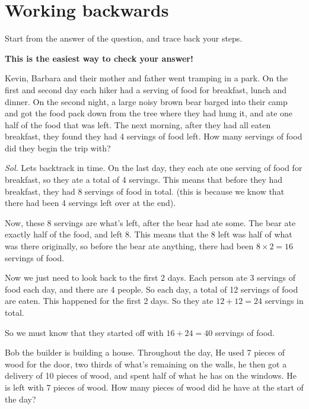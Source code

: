 \documentclass{article}
\theoremstyle{mytheoremstyle}
\theoremstyle{mytheoremstyle}
\theoremstyle{myproblemstyle}
\theoremstyle{myproblemstyle}
\begin{document}
    \section{Working backwards}
    Start from the answer of the question, and trace back your steps.

    \textbf{This is the easiest way to check your answer!}

    \begin{example}
        Kevin, Barbara and their mother and father went tramping in a park. On the first and second day each hiker had a serving of food for breakfast, lunch and dinner. On the second night, a large noisy brown bear barged into their camp and got the food pack down from the tree where they had hung it, and ate one half of the food that was left. The next morning, after they had all eaten breakfast, they found they had 4 servings of food left. How many servings of food did they begin the trip with?
    \end{example}

    \textit{ Sol. } Lets backtrack in time. On the last day, they each ate one serving of food for breakfast, so they ate a total of 4 servings. This means that before they had breakfast, they had 8 servings of food in total. (this is because we know that there had been 4 servings left over at the end).

    Now, these 8 servings are what's left, after the bear had ate some. The bear ate exactly half of the food, and left 8. This means that the 8 left was half of what was there originally, so before the bear ate anything, there had been $8 \times 2 = 16$ servings of food.

    Now we just need to look back to the first 2 days. Each person ate 3 servings of food each day, and there are 4 people. So each day, a total of 12 servings of food are eaten. This happened for the first 2 days. So they ate $12 + 12 = 24$ servings in total.

    So we must know that they started off with $16 + 24 = 40$ servings of food.

    \begin{example}
        Bob the builder is building a house. Throughout the day, He used 7 pieces of wood for the door, two thirds of what's remaining on the walls, he then got a delivery of 10 pieces of wood, and spent half of what he has on the windows. He is left with 7 pieces of wood. How many pieces of wood did he have at the start of the day?
    \end{example}
    
\end{document}
